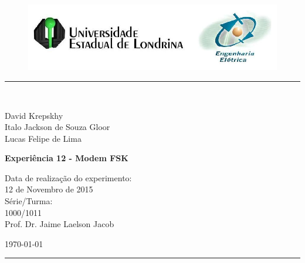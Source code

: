 \begin{titlepage}
\begin{center}
\begin{figure}[h]
\includegraphics[scale=0.76]{imagem/topdotitulo.png}
\end{figure}
\rule{\columnwidth}{1.5mm}
\

\large David Krepskhy\\
\large Italo Jackson de Souza Gloor\\
\large Lucas Felipe de Lima

\vspace{4cm}
{\bf \Large Experiência 12 - Modem FSK}
\vspace{3.5cm}

\begin{flushright}
Data de realização do experimento:\\
12 de Novembro de 2015\\
Série/Turma:\\
1000/1011\\
Prof. Dr. Jaime Laelson Jacob 
\end{flushright}

\vspace{3.2cm}
\today

\rule{\columnwidth}{1.3mm}
\end{center}
\end{titlepage}